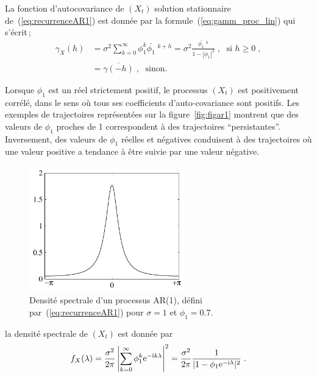 La fonction d'autocovariance de $(X_{t})$ solution stationnaire
de~(\ref{eq:recurrenceAR1}) est donn\'ee par la
formule~(\ref{eq:gamm_proc_lin}) qui s'\'ecrit\,;
\begin{align}
\label{eq:autocov:AR1}
\gamma_X(h)&= \sigma^2 \sum_{k=0}^\infty \phi_1^k \bar{\phi_1}\;^{k+h}
= \sigma^2 \frac{\bar{\phi_1}\;^{h}}{1 - |\phi_1|^2}\;,\;
\textrm{ si }h\geq 0\;,\\
&=\overline{\gamma(-h)}\;,\;\textrm{ sinon.}
\end{align}

Lorsque $\phi_1$ est un r\'eel strictement positif, le processus $(X_{t})$ est positivement
corr\'el\'e, dans le sens o\`u tous ses coefficients
d'auto-covariance sont positifs. Les exemples de trajectoires
repr\'esent\'ees sur la figure~\ref{fig:figar1} montrent que des valeurs
de $\phi_1$ proches de 1 correspondent \`a des trajectoires
``persistantes''. Inversement, des
valeurs de $\phi_1$ r\'eelles et n\'egatives conduisent \`a des trajectoires o\`u une valeur positive a tendance \`a \^{e}tre
suivie par une valeur n\'egative.
\begin{figure}
\centering
  \includegraphics[width=0.6\textwidth]{Figures/dspthAR1}
  \caption{Densit\'e spectrale d'un processus AR(1), d\'efini
  par~(\ref{eq:recurrenceAR1}) pour $\sigma=1$ et $\phi_1=0.7$.}
  \label{fig:dspthAR1}
\end{figure}
la densit\'e spectrale de $(X_t)$ est donn\'ee par
\begin{equation}
\label{eq:dsp:AR1}
 f_X(\lambda)
 = \frac{\sigma^2}{2 \pi} \left| \sum_{k=0}^\infty \phi_1^k \mathrm{e}^{-\mathrm{i} k\lambda} \right|^2
 = \frac{\sigma^2}{2 \pi} \frac{1}{|1 - \phi_1 \mathrm{e}^{-\mathrm{i} \lambda}
   |^2}\; .
\end{equation}
